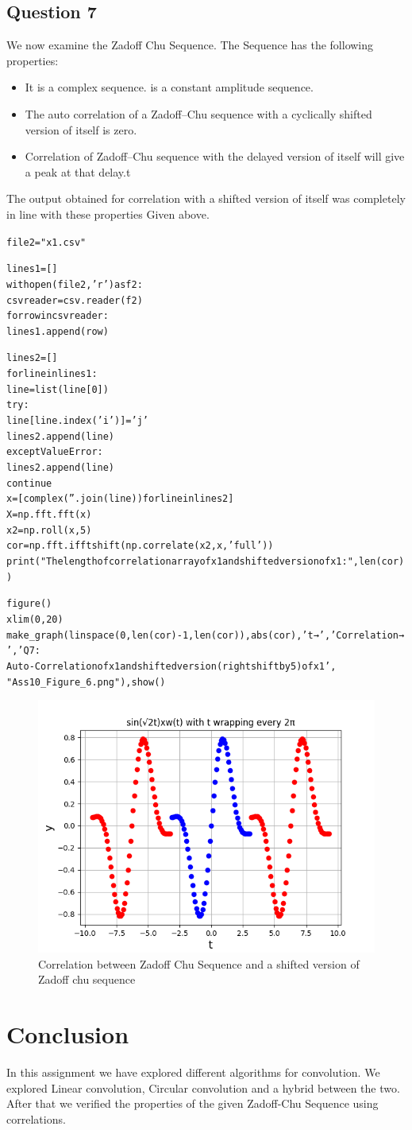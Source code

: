 \documentclass{article}
\begin{document}
\subsection{Question 7}
We now examine the Zadoff Chu Sequence. The Sequence has the following properties:

\begin{itemize}
\item It is a complex sequence.
\itemIt is a constant amplitude sequence.
\item The auto correlation of a Zadoff–Chu sequence with a cyclically shifted version of itself is zero.
\item Correlation of Zadoff–Chu sequence with the delayed version of itself will give a peak at that delay.t
\end{itemize}
The output obtained for correlation with a shifted version of itself was completely in line with these properties Given above.
\begin{alltt}
file2 = "x1.csv"

lines1 = []
with open(file2, 'r') as f2:
    csvreader = csv.reader(f2)
    for row in csvreader:
        lines1.append(row)

lines2 = []
for line in lines1:
    line = list(line[0])
    try :
        line[line.index('i')] = 'j'
        lines2.append(line)
    except ValueError:
        lines2.append(line)
        continue
x = [complex(''.join(line)) for line in lines2]
X = np.fft.fft(x)
x2 = np.roll(x, 5)
cor = np.fft.ifftshift(np.correlate(x2, x, 'full'))
print("The length of correlation array of x1 and shifted version of x1: ", len(cor))

figure()
xlim(0, 20)
make_graph(linspace(0, len(cor) - 1, len(cor)), abs(cor), 't →', 'Correlation →', 'Q7:
Auto-Correlation of x1 and shifted version(right shift by 5) of x1', 
"Ass10_Figure_6.png"),show()
\end{alltt}

\begin{figure}[h!]
\centering
\includegraphics[scale=0.6]{Figure_5.png}
\caption{Correlation between Zadoff Chu Sequence and a shifted version of Zadoff chu sequence}
\label{fig:universe}
\end{figure}

\newpage
\section{Conclusion}
In this assignment we have explored different algorithms for convolution. We explored Linear convolution, Circular convolution and a hybrid between the two. After that we verified the properties of the given Zadoff-Chu Sequence using correlations. 
\end{document}
